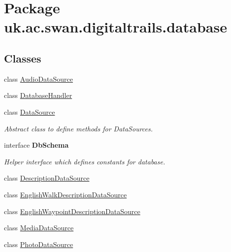 \hypertarget{namespaceuk_1_1ac_1_1swan_1_1digitaltrails_1_1database}{\section{Package uk.\+ac.\+swan.\+digitaltrails.\+database}
\label{namespaceuk_1_1ac_1_1swan_1_1digitaltrails_1_1database}
}
\subsection*{Classes}
\begin{DoxyCompactItemize}
\item 
class \hyperlink{classuk_1_1ac_1_1swan_1_1digitaltrails_1_1database_1_1_audio_data_source}{Audio\+Data\+Source}
\item 
class \hyperlink{classuk_1_1ac_1_1swan_1_1digitaltrails_1_1database_1_1_database_handler}{Database\+Handler}
\item 
class \hyperlink{classuk_1_1ac_1_1swan_1_1digitaltrails_1_1database_1_1_data_source}{Data\+Source}
\begin{DoxyCompactList}\small\item\em Abstract class to define methods for Data\+Sources. \end{DoxyCompactList}\item 
interface {\bfseries Db\+Schema}
\begin{DoxyCompactList}\small\item\em Helper interface which defines constants for database. \end{DoxyCompactList}\item 
class \hyperlink{classuk_1_1ac_1_1swan_1_1digitaltrails_1_1database_1_1_description_data_source}{Description\+Data\+Source}
\item 
class \hyperlink{classuk_1_1ac_1_1swan_1_1digitaltrails_1_1database_1_1_english_walk_description_data_source}{English\+Walk\+Description\+Data\+Source}
\item 
class \hyperlink{classuk_1_1ac_1_1swan_1_1digitaltrails_1_1database_1_1_english_waypoint_description_data_source}{English\+Waypoint\+Description\+Data\+Source}
\item 
class \hyperlink{classuk_1_1ac_1_1swan_1_1digitaltrails_1_1database_1_1_media_data_source}{Media\+Data\+Source}
\item 
class \hyperlink{classuk_1_1ac_1_1swan_1_1digitaltrails_1_1database_1_1_photo_data_source}{Photo\+Data\+Source}
\item 

\end{DoxyCompactItemize}
